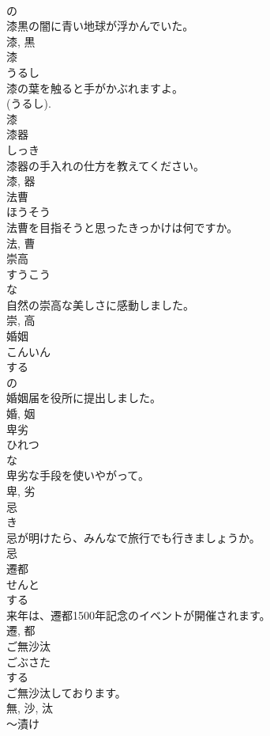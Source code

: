 \documentclass[8pt]{extreport}
\begin{document}
\begin{CJK}{UTF8}{min}
\\	の 
\\	漆黒の闇に青い地球が浮かんでいた。	
\\	漆, 黒	
\\	漆	
\\	うるし	
\\	漆の葉を触ると手がかぶれますよ。	
\\	(うるし). 
\\	漆	
\\	漆器	
\\	しっき	
\\	漆器の手入れの仕方を教えてください。	
\\	漆, 器	
\\	法曹	
\\	ほうそう	
\\	法曹を目指そうと思ったきっかけは何ですか。	
\\	法, 曹	
\\	崇高	
\\	すうこう	
\\	な 
\\	自然の崇高な美しさに感動しました。	
\\	崇, 高	
\\	婚姻	
\\	こんいん	
\\	する 
\\	の 
\\	婚姻届を役所に提出しました。	
\\	婚, 姻	
\\	卑劣	
\\	ひれつ	
\\	な 
\\	卑劣な手段を使いやがって。	
\\	卑, 劣	
\\	忌	
\\	き	
\\	忌が明けたら、みんなで旅行でも行きましょうか。	
\\	忌	
\\	遷都	
\\	せんと	
\\	する 
\\	来年は、遷都1500年記念のイベントが開催されます。	
\\	遷, 都	
\\	ご無沙汰	
\\	ごぶさた	
\\	する 
\\	ご無沙汰しております。	
\\	無, 沙, 汰	
\\	〜漬け	

\end{CJK}
\end{document}
